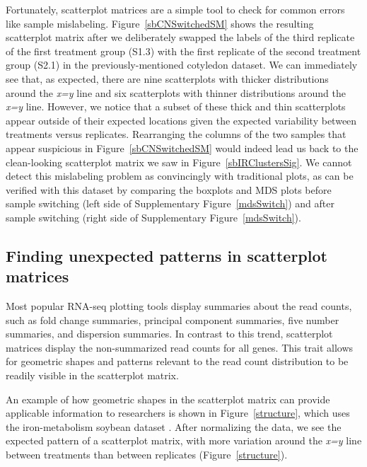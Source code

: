\documentclass[11pt,a4paper,oldfontcommands,openany]{memoir}
\numberwithin{equation}{section} %
\begin{document}
Fortunately, scatterplot matrices are a simple tool to check for common errors like sample mislabeling. Figure~\ref{sbCNSwitchedSM} shows the resulting scatterplot matrix after we deliberately swapped the labels of the third replicate of the first treatment group (S1.3) with the first replicate of the second treatment group (S2.1) in the previously-mentioned cotyledon dataset. We can immediately see that, as expected, there are nine scatterplots with thicker distributions around the \textit{x=y} line and six scatterplots with thinner distributions around the \textit{x=y} line. However, we notice that a subset of these thick and thin scatterplots appear outside of their expected locations given the expected variability between treatments versus replicates. Rearranging the columns of the two samples that appear suspicious in Figure~\ref{sbCNSwitchedSM} would indeed lead us back to the clean-looking scatterplot matrix we saw in Figure~\ref{sbIRClustersSig}. We cannot detect this mislabeling problem as convincingly with traditional plots, as can be verified with this dataset by comparing the boxplots and MDS plots before sample switching (left side of Supplementary Figure~\ref{mdsSwitch}) and after sample switching (right side of Supplementary Figure~\ref{mdsSwitch}). 


\subsection{Finding unexpected patterns in scatterplot matrices}

Most popular RNA-seq plotting tools display summaries about the read counts, such as fold change summaries, principal component summaries, five number summaries, and dispersion summaries. In contrast to this trend, scatterplot matrices display the non-summarized read counts for all genes. This trait allows for geometric shapes and patterns relevant to the read count distribution to be readily visible in the scatterplot matrix.

An example of how geometric shapes in the scatterplot matrix can provide applicable information to researchers is shown in Figure~\ref{structure}, which uses the iron-metabolism soybean dataset \citep{Lauter16}. After normalizing the data, we see the expected pattern of a scatterplot matrix, with more variation around the \textit{x=y} line between treatments than between replicates (Figure~\ref{structure}). 
\end{document}
